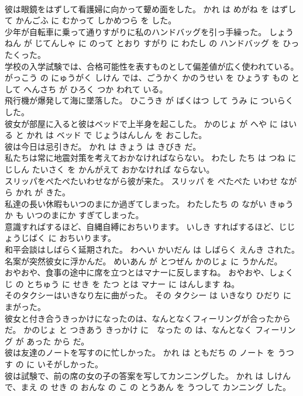 \documentclass[8pt]{extreport}
\begin{document}
\begin{CJK}{UTF8}{min}
\\	彼は眼鏡をはずして看護婦に向かって顰め面をした。	かれ は めがね を はずして かんごふ に むかって しかめつら を した。	
\\	少年が自転車に乗って通りすがりに私のハンドバッグを引っ手繰った。	しょうねん が じてんしゃ に のって とおり すがり に わたし の ハンドバッグ を ひったくった。	
\\	学校の入学試験では、合格可能性を表すものとして偏差値が広く使われている。	がっこう の にゅうがく しけん では、ごうかく かのうせい を ひょうす もの として へんさち が ひろく つか われて いる。	
\\	飛行機が爆発して海に墜落した。	ひこうき が ばくはつ して うみ に ついらく した。	
\\	彼女が部屋に入ると彼はベッドで上半身を起こした。	かのじょ が へや に はいる と かれ は ベッド で じょうはんしん を おこした。	
\\	彼は今日は忌引きだ。	かれ は きょう は きびき だ。	
\\	私たちは常に地震対策を考えておかなければならない。	わたし たち は つね に じしん たいさく を かんがえて おかなければ ならない。	
\\	スリッパをぺたぺたいわせながら彼が来た。	スリッパ を ぺたぺた いわせ ながら かれ が きた。	
\\	私達の長い休暇もいつのまにか過ぎてしまった。	わたしたち の ながい きゅうか も いつのまにか すぎてしまった。	
\\	意識すればするほど、自縄自縛におちいります。	いしき すればするほど、じじょうじばく に おちいります。	
\\	和平会談はしばらく延期された。	わへい かいだん は しばらく えんき された。	
\\	名案が突然彼女に浮かんだ。	めいあん が とつぜん かのじょ に うかんだ。	
\\	おやおや、食事の途中に席を立つとはマナーに反しますね。	おやおや、しょくじ の とちゅう に せき を たつ とは マナー に はんします ね。	
\\	そのタクシーはいきなり左に曲がった。	その タクシー は いきなり ひだり に まがった。	
\\	彼女と付き合うきっかけになったのは、なんとなくフィーリングが合ったからだ。	かのじょ と つきあう きっかけ に　なった の は、なんとなく フィーリング が あった から だ。	
\\	彼は友達のノートを写すのに忙しかった。	かれ は ともだち の ノート を うつす の に いそがしかった。	
\\	彼は試験で、前の席の女の子の答案を写してカンニングした。	かれ は しけん で、まえ の せき の おんな の こ の とうあん を うつして カンニング した。	

\end{CJK}
\end{document}
